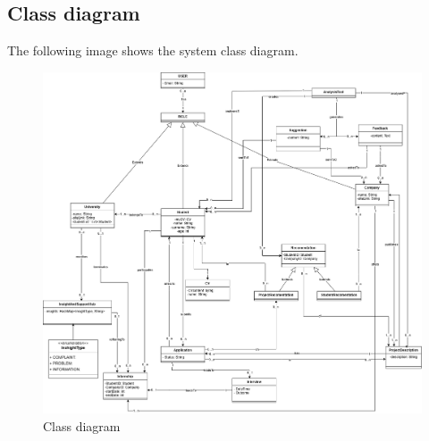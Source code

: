 \pagebreak
\subsection{Class diagram}
The following image shows the system class diagram.
\begin{figure}[H]
    \centering
    \includegraphics[width=1\linewidth]{RASD//Images/UML.drawio.png}
    \caption{Class diagram}
\end{figure}

\pagebreak
